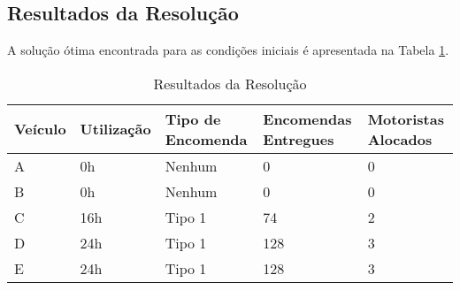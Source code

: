 \subsection{Resultados da Resolução}\label{subsec:resultados-da-resolucao}
A solução ótima encontrada para as condições iniciais é apresentada na Tabela \ref{tab:resultados}.
\begin{table}[H]
    \centering
    \label{tab:resultados}
    \begin{tabular}{@{}lllll@{}}
        \midrule
        Veículo & Utilização & Tipo de Encomenda & Encomendas Entregues & Motoristas Alocados \\ \midrule
        A       & 0h         & Nenhum            & 0                    & 0                   \\
        B       & 0h         & Nenhum            & 0                    & 0                   \\
        C       & 16h        & Tipo 1            & 74                   & 2                   \\
        D       & 24h        & Tipo 1            & 128                  & 3                   \\
        E       & 24h        & Tipo 1            & 128                  & 3                   \\ \bottomrule
    \end{tabular}
    \caption{Resultados da Resolução}
\end{table}

